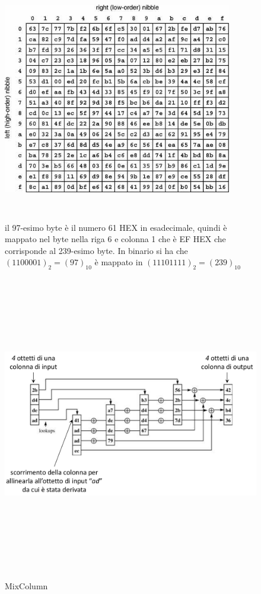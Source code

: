 \begin{figure}[htbp]
	\centering%
	\subfigure%
	{\includegraphics[height=10cm, width=10cm, keepaspectratio]{Immagini/chiave_segreta/rijndael_sbox.png}}
	\caption{il 97-esimo byte è il numero 61 HEX in esadecimale, quindi è mappato nel byte nella riga 6 e colonna 1 che è EF HEX che corrisponde
al 239-esimo byte. In binario si ha che $(1100001)_{2} = (97)_{10}$
è mappato in $(11101111)_{2} = (239)_{10}$ \label{fig:Rij_mixcol}} 	
\end{figure}

\begin{figure}[htbp]
	\centering%
	\subfigure%
	{\includegraphics[height=13cm, width=13cm, keepaspectratio]{Immagini/chiave_segreta/rijndael_mixcol.png}}
	\caption{MixColumn \label{fig:Rij_mixcol}} 	
\end{figure}

